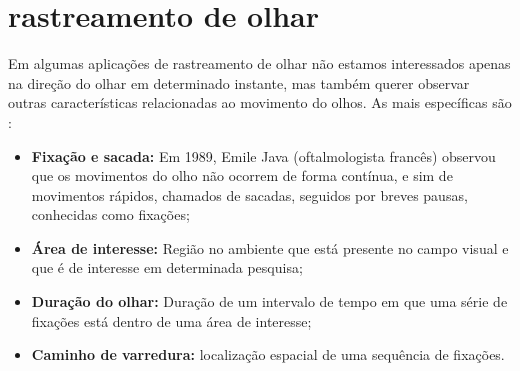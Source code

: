 \section{ rastreamento de olhar}

Em algumas aplicações de rastreamento de olhar não estamos interessados apenas na direção do olhar em determinado instante, mas também   querer observar outras características  relacionadas ao movimento do olhos. As  mais específicas são \cite{lupung}:

\begin{itemize}
\item {\bf Fixação e sacada:} Em 1989, Emile Java (oftalmologista francês) observou que os movimentos do olho não ocorrem de forma contínua, e sim de movimentos rápidos, chamados de sacadas, seguidos por breves pausas, conhecidas como fixações;

\item {\bf Área de interesse:} Região no ambiente que está presente no campo visual e que é de interesse em determinada pesquisa;

\item {\bf Duração do olhar:} Duração de um intervalo de tempo em que uma série de fixações está dentro de uma área de interesse;

\item {\bf Caminho de varredura:} localização espacial de uma sequência de fixações.
\end{itemize}
